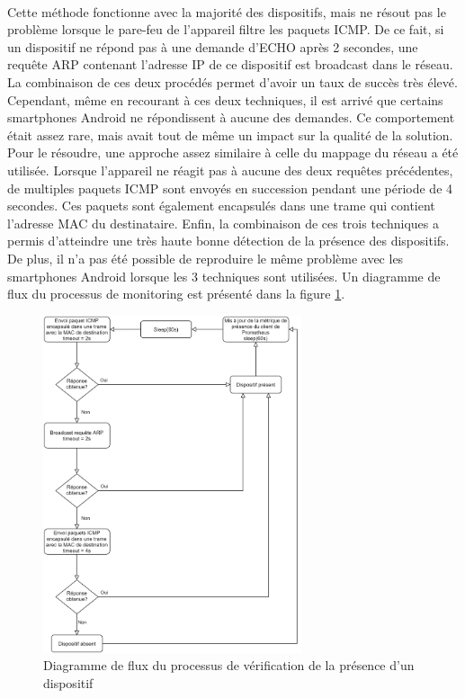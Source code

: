 ~

\noindent
Cette méthode fonctionne avec la majorité des dispositifs, mais ne résout pas le problème lorsque le pare-feu de l’appareil filtre les paquets ICMP. De ce fait, si un dispositif ne répond pas à une demande d’ECHO après 2 secondes, une requête ARP contenant l’adresse IP de ce dispositif est broadcast dans le réseau. La combinaison de ces deux procédés permet d’avoir un taux de succès très élevé. Cependant, même en recourant à ces deux techniques, il est arrivé que certains smartphones Android ne répondissent à aucune des demandes. Ce comportement était assez rare, mais avait tout de même un impact sur la qualité de la solution. Pour le résoudre, une approche assez similaire à celle du mappage du réseau a été utilisée. Lorsque l'appareil ne réagit pas à aucune des deux requêtes précédentes, de multiples paquets ICMP sont envoyés en succession pendant une période de 4 secondes. Ces paquets sont également encapsulés dans une trame qui contient l’adresse MAC du destinataire. Enfin, la combinaison de ces trois techniques a permis d’atteindre une très haute bonne détection de la présence des dispositifs. De plus, il n’a pas été possible de reproduire le même problème avec les smartphones Android lorsque les 3 techniques sont utilisées. Un diagramme de flux du processus de monitoring est présenté dans la figure \ref{fig:device_presence}.

\begin{figure}[ht!]
  \centering
  \includegraphics[width=0.68\textwidth]{img/app/device_mon.png}
  \caption{Diagramme de flux du processus de vérification de la présence d'un dispositif}
  \label{fig:device_presence}
\end{figure}
~

